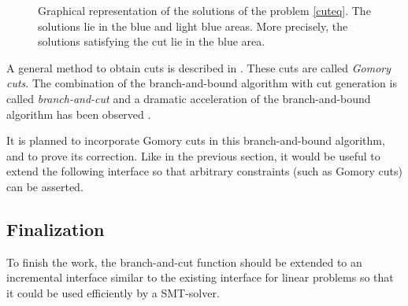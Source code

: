 \documentclass{article}
\begin{document}
\begin{figure}[h]
  \label{cutfig}
  \centering


  \caption{Graphical representation of the solutions of the problem
    \ref{cuteq}. The solutions lie in the blue and light blue areas. More
    precisely, the solutions satisfying the cut lie in the blue area.}
\end{figure}

A general method to obtain cuts is described in \cite[Section 4]{Dutertre2006}.
These cuts are called \textit{Gomory cuts}. The combination of the
branch-and-bound algorithm with cut generation is called
\textit{branch-and-cut} and a dramatic acceleration of the branch-and-bound
algorithm has been observed \cite{Ongoing2012}. %

It is planned to incorporate Gomory cuts in this branch-and-bound algorithm,
and to prove its correction. Like in the previous section, it would
be useful to extend the following interface so that arbitrary constraints (such
as Gomory cuts) can be asserted.

\subsection{Finalization}
To finish the work, the branch-and-cut function should be extended to an
incremental interface similar to the existing interface for linear problems so
that it could be used efficiently by a SMT-solver.
\end{document}
